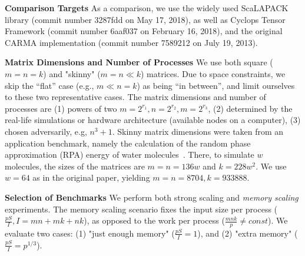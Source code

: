 \documentclass[sigplan,review,anonymous,10pt]{acmart}\settopmatter{printfolios=true,printccs=false,printacmref=false}
\newcommand\mac[1]{\textcolor{red}{[Mac: #1]}}
\newcommand{\macb}[1]{\textbf{\textsf{#1}}}
\begin{document}
\macb{Comparison Targets}
%
As a comparison, we use the widely used ScaLAPACK library (commit number 
3287fdd 
on May 17, 2018), as well 
as Cyclops Tensor Framework (commit number 6aaf037 on February 16, 2018), and 
the original CARMA implementation (commit number 7589212 on July 19, 2013).

\macb{Matrix Dimensions and Number of Processes}
We use both square ($m = n = k$) and "skinny" ($m = n \ll k$) matrices. Due to 
space constraints, we skip the ``flat'' case (e.g., $m \ll n = k$) as being 
``in between'', and limit 
ourselves to these two representative cases. The matrix dimensions and number 
of 
processes are (1) powers of 
two $m = 2^{r_1}, n = 2^{r_2}, m = 2^{r_3}$, (2) determined by the real-life 
simulations or hardware architecture (available nodes on a computer), (3) 
chosen adversarily, e.g, $n^3 + 1$. 
Skinny matrix dimensions were taken from an application benchmark, namely the 
calculation of the random phase approximation (RPA) energy of water 
molecules~\cite{joost}. There, to simulate $w$ molecules, the sizes 
of the 
matrices are $m=n=136w$ and $k = 228w^2$. We use $w=64$ as in the 
original paper, yielding $m=n=8704, k = 933888$.

\macb{Selection of Benchmarks}
%
We perform both strong scaling and \emph{memory scaling} experiments. 
The memory scaling scenario fixes the input size per process 
($\frac{pS}{I}, I = mn + mk + nk$), as opposed to the work per 
process ($\frac{mnk}{p} \ne const$). We evaluate two cases: (1) "just enough 
memory" ($\frac{pS}{I} = 1$), and (2) "extra memory"  ($\frac{pS}{I} = 
p^{1/3}$).
%
%
%
\end{document}
